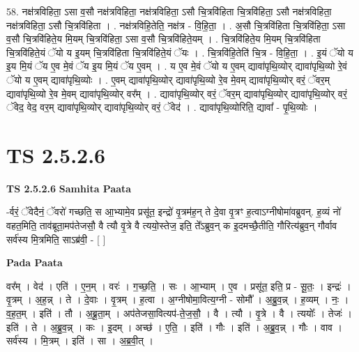 \documentclass[17pt]{extarticle}
\begin{document}
58. नक्ष॑त्रविहिता॒ ऽसा व॒सौ नक्ष॑त्रविहिता॒ नक्ष॑त्रविहिता॒ ऽसौ चि॒त्रवि॑हिता चि॒त्रवि॑हिता॒ ऽसौ नक्ष॑त्रविहिता॒ नक्ष॑त्रविहिता॒ ऽसौ चि॒त्रवि॑हिता । . नक्ष॑त्रविहि॒तेति॒ नक्ष॑त्र - वि॒हि॒ता॒ । . अ॒सौ चि॒त्रवि॑हिता चि॒त्रवि॑हिता॒ ऽसा व॒सौ चि॒त्रवि॑हिते॒य मि॒यम् चि॒त्रवि॑हिता॒ ऽसा व॒सौ चि॒त्रवि॑हिते॒यम् । . चि॒त्रवि॑हिते॒य मि॒यम् चि॒त्रवि॑हिता चि॒त्रवि॑हिते॒यं ॅयो य इ॒यम् चि॒त्रवि॑हिता चि॒त्रवि॑हिते॒यं ॅयः । . चि॒त्रवि॑हि॒तेति॑ चि॒त्र - वि॒हि॒ता॒ । . इ॒यं ॅयो य इ॒य मि॒यं ॅय ए॒व मे॒वं ॅय इ॒य मि॒यं ॅय ए॒वम् । . य ए॒व मे॒वं ॅयो य ए॒वम् द्यावा॑पृथि॒व्योर् द्यावा॑पृथि॒व्यो रे॒वं ॅयो य ए॒वम् द्यावा॑पृथि॒व्योः । . ए॒वम् द्यावा॑पृथि॒व्योर् द्यावा॑पृथि॒व्यो रे॒व मे॒वम् द्यावा॑पृथि॒व्योर् वरं॒ ॅवर॒म् द्यावा॑पृथि॒व्यो रे॒व मे॒वम् द्यावा॑पृथि॒व्योर् वर᳚म् । . द्यावा॑पृथि॒व्योर् वरं॒ ॅवर॒म् द्यावा॑पृथि॒व्योर् द्यावा॑पृथि॒व्योर् वरं॒ ॅवेद॒ वेद॒ वर॒म् द्यावा॑पृथि॒व्योर् द्यावा॑पृथि॒व्योर् वरं॒ ॅवेद॑ । . द्यावा॑पृथि॒व्योरिति॒ द्यावा᳚ - पृ॒थि॒व्योः । \newline
\pagebreak
{}

\section{ TS 2.5.2.6 }

\textbf{TS 2.5.2.6 } \newline
\textbf{Samhita Paata} \newline

-र्वरं॒ ॅवेदैनं॒ ॅवरो॑ गच्छति॒ स आ॒भ्यामे॒व प्रसू॑त॒ इन्द्रो॑ वृ॒त्रम॑ह॒न् ते दे॒वा वृ॒त्रꣳ ह॒त्वाऽग्नीषोमा॑वब्रुवन्. ह॒व्यं नो॑ वहत॒मिति॒ ताव॑ब्रूता॒मप॑तेजसौ॒ वै त्यौ वृ॒त्रे वै त्ययो॒स्तेज॒ इति॒ ते᳚ऽब्रुव॒न् क इ॒दमच्छै॒तीति॒ गौरित्य॑ब्रुव॒न् गौर्वाव सर्व॑स्य मि॒त्रमिति॒ साऽब्र॑वी॒ - [  ] \newline

\textbf{Pada Paata} \newline

वर᳚म् । वेद॑ । एति॑ । ए॒न॒म् । वरः॑ । ग॒च्छ॒ति॒ । सः । आ॒भ्याम् । ए॒व । प्रसू॑त॒ इति॒ प्र - सू॒तः॒ । इन्द्रः॑ । वृ॒त्रम् । अ॒ह॒न्न् । ते । दे॒वाः । वृ॒त्रम् । ह॒त्वा । अ॒ग्नीषोमा॒वित्य॒ग्नी - सोमौ᳚ । अ॒ब्रु॒व॒न्न् । ह॒व्यम् । नः॒ । व॒ह॒त॒म् । इति॑ । तौ । अ॒ब्रू॒ता॒म् । अप॑तेजसा॒वित्यप॑-ते॒ज॒सौ॒ । वै । त्यौ । वृ॒त्रे । वै । त्ययोः᳚ । तेजः॑ । इति॑ । ते । अ॒ब्रु॒व॒न्न् । कः । इ॒दम् । अच्छ॑ । ए॒ति॒ । इति॑ । गौः । इति॑ । अ॒ब्रु॒व॒न्न् । गौः । वाव । सर्व॑स्य । मि॒त्रम् । इति॑ । सा । अ॒ब्र॒वी॒त् ।  \newline
\end{document}
